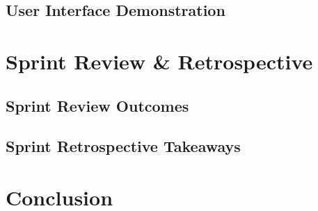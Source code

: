 \subsection{User Interface Demonstration}
\label{subsec:ch4_ui_screenshots}

\section{Sprint Review \& Retrospective}
\label{sec:ch4_review_retro}
\subsection{Sprint Review Outcomes}
\label{subsec:ch4_review}

\subsection{Sprint Retrospective Takeaways}
\label{subsec:ch4_retro}

\section{Conclusion}
\label{sec:ch4_conclusion}
